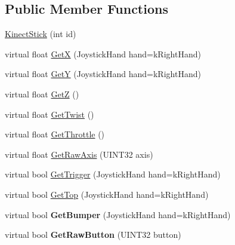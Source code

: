 \subsection*{Public Member Functions}
\begin{DoxyCompactItemize}
\item 
\hyperlink{classKinectStick_a4063caee2fd310cc104684a30aff31e4}{KinectStick} (int id)
\item 
virtual float \hyperlink{classKinectStick_a81aec4d7e6f6202843911ef3a700f403}{GetX} (JoystickHand hand=kRightHand)
\item 
virtual float \hyperlink{classKinectStick_ade311519e1ad707b6a5003cbe64989f1}{GetY} (JoystickHand hand=kRightHand)
\item 
virtual float \hyperlink{classKinectStick_a43882b03749a3fc087ce7e632f5010a3}{GetZ} ()
\item 
virtual float \hyperlink{classKinectStick_aa7c2d706db00247c8faec0bcf68a69b6}{GetTwist} ()
\item 
virtual float \hyperlink{classKinectStick_a1b370b02304f499fd2d347ce2d6b6e5e}{GetThrottle} ()
\item 
virtual float \hyperlink{classKinectStick_a80f0f1ddfbe0c9ae5096bb575edb8a05}{GetRawAxis} (UINT32 axis)
\item 
virtual bool \hyperlink{classKinectStick_a372d0270fa3e9055596d97b370f69866}{GetTrigger} (JoystickHand hand=kRightHand)
\item 
virtual bool \hyperlink{classKinectStick_ad7127343b58e1085062430ee24b5cb2d}{GetTop} (JoystickHand hand=kRightHand)
\item 
\hypertarget{classKinectStick_a82313329ccd83e34771f3ea2f8de4fbe}{
virtual bool {\bfseries GetBumper} (JoystickHand hand=kRightHand)}
\label{classKinectStick_a82313329ccd83e34771f3ea2f8de4fbe}

\item 
\hypertarget{classKinectStick_a0fa75c3200f06145eb045b9897a7d570}{
virtual bool {\bfseries GetRawButton} (UINT32 button)}
\label{classKinectStick_a0fa75c3200f06145eb045b9897a7d570}

\end{DoxyCompactItemize}



